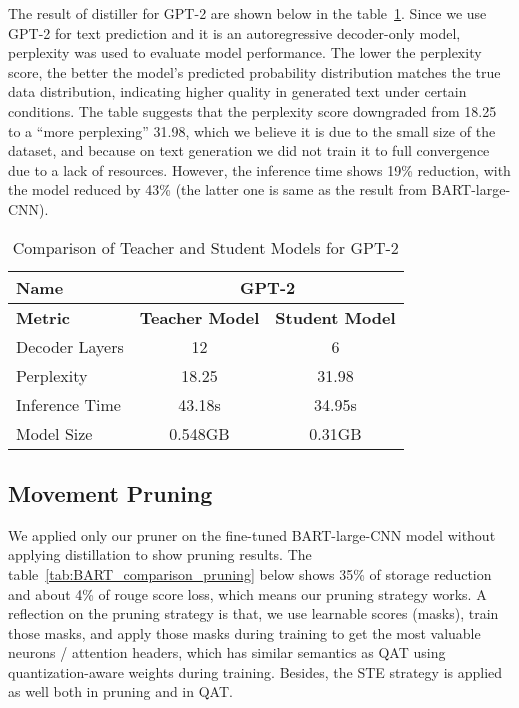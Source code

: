 The result of distiller for GPT-2 are shown below in the table~\ref{tab:gpt2_comparison}. Since we use GPT-2 for text prediction and it is an autoregressive decoder-only model, perplexity was used to evaluate model performance. The lower the perplexity score, the better the model's predicted probability distribution matches the true data distribution, indicating higher quality in generated text under certain conditions. The table suggests that the perplexity score downgraded from 18.25 to a ``more perplexing'' 31.98, which we believe it is due to the small size of the dataset, and because on text generation we did not train it to full convergence due to a lack of resources. However, the inference time shows 19\% reduction, with the model reduced by 43\% (the latter one is same as the result from BART-large-CNN).

\begin{table}[h!]
    \centering
    \begin{tabular}{lcc}
        \toprule
        \textbf{Name}         & \multicolumn{2}{c}{\textbf{GPT-2}} \\ \midrule
        \textbf{Metric}       & \textbf{Teacher Model} & \textbf{Student Model} \\ \midrule
        Decoder Layers        & 12                     & 6                     \\
        Perplexity            & 18.25                  & 31.98                  \\
        Inference Time        & 43.18s                 & 34.95s                 \\
        Model Size            & 0.548GB                & 0.31GB                 \\ \bottomrule
    \end{tabular}
    \caption{Comparison of Teacher and Student Models for GPT-2}
    \label{tab:gpt2_comparison}
\end{table}

\subsection{Movement Pruning}
We applied only our pruner on the fine-tuned BART-large-CNN model without applying distillation to show pruning results. The table~\ref{tab:BART_comparison_pruning} below shows 35\% of storage reduction and about 4\% of rouge score loss, which means our pruning strategy works. A reflection on the pruning strategy is that, we use learnable scores (masks), train those masks, and apply those masks during training to get the most valuable neurons / attention headers, which has similar semantics as QAT using quantization-aware weights during training. Besides, the STE strategy is applied as well both in pruning and in QAT.

